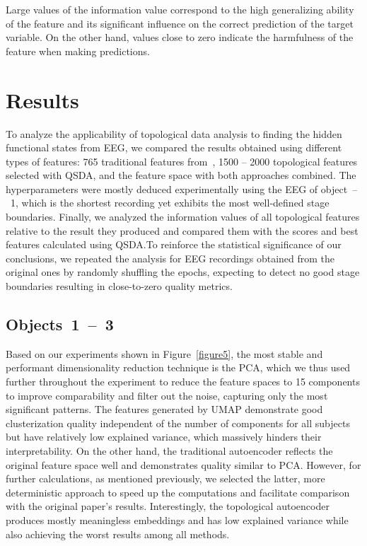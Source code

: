 \documentclass[shortAfour,times,sagev]{sagej}
\begin{document}
Large values of the information value correspond to the high generalizing ability of the feature and its significant influence on the correct prediction of the target variable. On the other hand, values close to zero indicate the harmfulness of the feature when making predictions.

\section{Results}

To analyze the applicability of topological data analysis to finding the hidden
functional states from EEG, we compared the results obtained using different types
of features: 765 traditional features from~\cite{SDA}, 1500 -- 2000 topological
features selected with QSDA, and the feature space with both approaches combined.
The hyperparameters were mostly deduced experimentally using the EEG of
object~\mbox{--}~1, which is the shortest recording yet exhibits the most
well-defined stage boundaries. Finally, we analyzed the information values
of all topological features relative to the result they produced and compared
them with the scores and best features calculated using QSDA.\@ To reinforce the
statistical significance of our conclusions, we repeated the analysis for EEG
recordings obtained from the original ones by randomly shuffling the epochs,
expecting to detect no good stage boundaries resulting in close-to-zero quality metrics.

\subsection{Objects~1~\mbox{--}~3}

Based on our experiments shown in Figure~\ref{figure5}, the most stable and performant
dimensionality reduction technique is the PCA, which we thus used further
throughout the experiment to reduce the feature spaces to 15 components 
to improve comparability and filter out the noise, capturing only the
most significant patterns. The features generated by UMAP demonstrate good
clusterization quality independent of the number of components for all
subjects but have relatively low explained variance, which massively
hinders their interpretability. On the other hand, the traditional autoencoder
reflects the original feature space well and demonstrates quality similar to PCA.\@
However, for further calculations, as mentioned previously, we selected the latter,
more deterministic approach to speed up the computations and facilitate comparison
with the original paper's results. Interestingly, the topological autoencoder
produces mostly meaningless embeddings and has low explained variance while
also achieving the worst results among all methods. 
\end{document}
